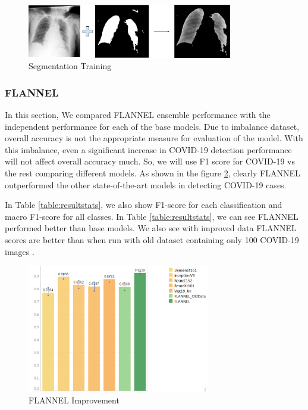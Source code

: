 \documentclass{sigkddExp}
\begin{document}
\begin{figure}[h]
    \includegraphics[width=0.8\textwidth]{../doc/images/segmentation_training.png}
    \caption{Segmentation Training}
    \label{fig:segtrain}
\end{figure}

\subsubsection{FLANNEL}

In this section, We compared FLANNEL ensemble performance with the independent
performance for each of the base models. Due to imbalance dataset, overall
accuracy is not the appropriate measure for evaluation of the model. With this
imbalance, even a significant increase in COVID-19 detection performance will
not affect overall accuracy much. So, we will use F1 score for COVID-19 vs the
rest comparing different models. As shown in the figure \ref{fig:f1score},
clearly FLANNEL outperformed the other state-of-the-art models in detecting
COVID-19 cases.

In Table \ref{table:resultstats}, we also show F1-score for each classification
and macro F1-score for all classes. In Table \ref{table:resultstats}, we can see
FLANNEL performed better than base models. We also see with improved data FLANNEL
scores are better than when run with old dataset containing only 100 COVID-19 images
\cite{10.1093/jamia/ocaa280}.


\begin{figure}[H]
    \includegraphics[width=8cm]{../doc/images/F1Score_vs_rest.png}
    \caption{FLANNEL Improvement}
    \label{fig:f1score}
\end{figure}
\end{document}
